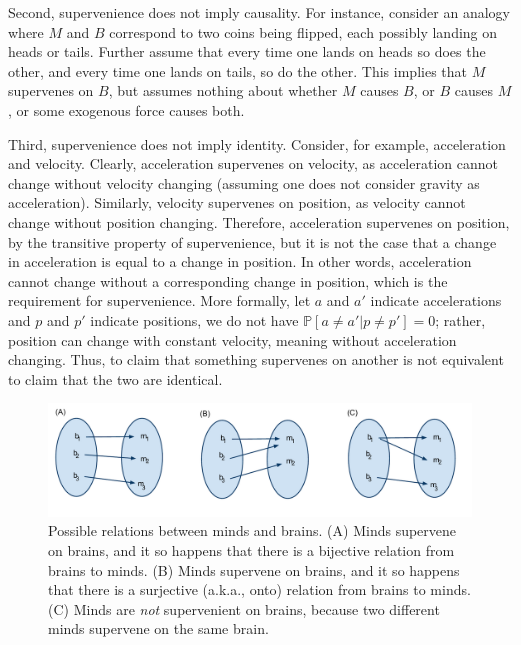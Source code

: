 \documentclass{article}
\newcommand{\PP}{\mathbb{P}}           %
\begin{document}
Second,  supervenience does not imply causality. %
For instance, consider an analogy where $M$ and $B$ correspond to two coins being flipped, each possibly landing on heads or tails.  Further assume that every time one lands on heads so does the other, and every time one lands on tails, so do the other. This implies that $M$ supervenes on $B$, but assumes nothing about whether $M$ causes $B$, or $B$ causes $M$, or some exogenous force causes both.  

Third, supervenience does not imply identity.  Consider, for example, acceleration and velocity.  Clearly, acceleration supervenes on velocity, as acceleration cannot change without velocity changing (assuming one does not consider gravity as acceleration).  Similarly, velocity supervenes on position, as velocity cannot change without position changing.  Therefore, acceleration supervenes on position, by the transitive property of supervenience, but it is not the case that a change in acceleration is equal to a change in position. In other words, acceleration cannot change without a corresponding change in position, which is the requirement for supervenience. More formally, let $a$ and $a'$ indicate accelerations and $p$ and $p'$ indicate positions, we do not have $\PP[a \neq a' | p \neq p'] = 0$; rather, position can change with constant velocity, meaning without acceleration changing.  Thus, to claim that something supervenes on another is not equivalent to claim that the two are identical.

\begin{figure}[h!tbp]
	\centering
		\includegraphics[width=1\linewidth]{supervenience_relations.pdf}
	\caption{Possible relations between minds and brains.  (A) Minds supervene on brains, and it so happens that there is a bijective relation from brains to minds.  (B) Minds supervene on brains, and it so happens that there is a surjective (a.k.a., onto) relation from brains to minds. (C) Minds are \emph{not} supervenient on brains, because two different minds supervene on the same brain.}
	\label{fig:rel}
\end{figure}
\end{document}
